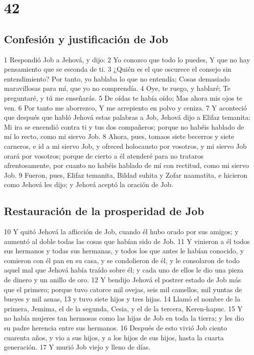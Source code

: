 \chapter{42}

\section*{Confesión y justificación de Job}  

1 Respondió Job a Jehová, y dijo:  
2 Yo conozco que todo lo puedes,  
Y que no hay pensamiento que se esconda de ti.  
3 ¿Quién es el que oscurece el consejo sin entendimiento?  
Por tanto, yo hablaba lo que no entendía;  
Cosas demasiado maravillosas para mí, que yo no comprendía.  
4 Oye, te ruego, y hablaré;  
Te preguntaré, y tú me enseñarás. 
5 De oídas te había oído;  
Mas ahora mis ojos te ven.  
6 Por tanto me aborrezco,  
Y me arrepiento en polvo y ceniza.  
7 Y aconteció que después que habló Jehová estas palabras a Job, Jehová dijo a Elifaz temanita: Mi ira se encendió contra ti y tus dos compañeros; porque no habéis hablado de mí lo recto, como mi siervo Job.  
8 Ahora, pues, tomaos siete becerros y siete carneros, e id a mi siervo Job, y ofreced holocausto por vosotros, y mi siervo Job orará por vosotros; porque de cierto a él atenderé para no trataros afrentosamente, por cuanto no habéis hablado de mí con rectitud, como mi siervo Job.  
9 Fueron, pues, Elifaz temanita, Bildad suhita y Zofar naamatita, e hicieron como Jehová les dijo; y Jehová aceptó la oración de Job.  
\section*{Restauración de la prosperidad de Job}  
10 Y quitó Jehová la aflicción de Job, cuando él hubo orado por sus amigos; y aumentó al doble todas las cosas que habían sido de Job. 
11 Y vinieron a él todos sus hermanos y todas sus hermanas, y todos los que antes le habían conocido, y comieron con él pan en su casa, y se condolieron de él, y le consolaron de todo aquel mal que Jehová había traído sobre él; y cada uno de ellos le dio una pieza de dinero y un anillo de oro.  
12 Y bendijo Jehová el postrer estado de Job más que el primero; porque tuvo catorce mil ovejas, seis mil camellos, mil yuntas de bueyes y mil asnas,  
13 y tuvo siete hijos y tres hijas.  
14 Llamó el nombre de la primera, Jemima, el de la segunda, Cesia, y el de la tercera, Keren-hapuc.  
15 Y no había mujeres tan hermosas como las hijas de Job en toda la tierra; y les dio su padre herencia entre sus hermanos.  
16 Después de esto vivió Job ciento cuarenta años, y vio a sus hijos, y a los hijos de sus hijos, hasta la cuarta generación.  
17 Y murió Job viejo y lleno de días.

